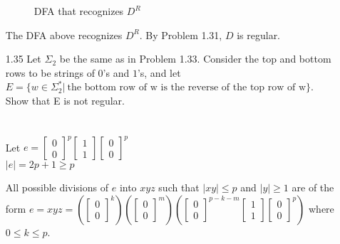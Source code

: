\begin{enumerate}
          \begin{figure}[H]
              \centering
              \caption{DFA that recognizes $D^R$}
          \end{figure}

          The DFA above recognizes $D^R$. By Problem 1.31, $D$ is regular.

    \item [1.35]
          Let $\Sigma_2$ be the same as in Problem 1.33. Consider the top and bottom rows to be strings of $0$'s  and $1$'s, and let \\
          $E =\{w \in \Sigma^\ast_2 |~ \text{the bottom row of w is the reverse of the top row of w}\}$. \\
          Show that E is not regular.
          \\
          \\
          \\
          Let $e = \begin{bmatrix}0 \\0\end{bmatrix}^p \begin{bmatrix}1 \\1\end{bmatrix} \begin{bmatrix}0 \\0\end{bmatrix}^p$\\
          $\left|e\right| = 2p + 1 \ge p$

          All possible divisions of $e$ into $xyz$ such that $\left|xy\right| \le p$ and $\left|y\right| \ge 1$ are of the form $e = xyz = \left(\begin{bmatrix}0 \\0\end{bmatrix}^k\right) \left(\begin{bmatrix}0 \\0\end{bmatrix}^m\right)\left(\begin{bmatrix}0 \\0\end{bmatrix}^{p-k-m} \begin{bmatrix}1 \\1\end{bmatrix} \begin{bmatrix}0 \\0\end{bmatrix}^{p}\right)$ where $0 \le k \le p$.


\end{enumerate}
